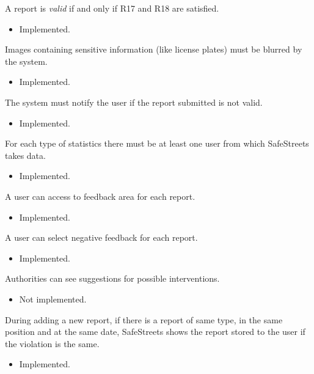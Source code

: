\documentclass[../ITD.tex]{subfiles}
\begin{document}
\begin{enumerate}
         A report is \textit{valid} if and only if R17 and R18 are satisfied.
        \begin{itemize}
            \item Implemented.
        \end{itemize}

         Images containing sensitive information (like license plates) must be blurred by the system.
        \begin{itemize}
            \item Implemented.
        \end{itemize}

         The system must notify the user if the report submitted is not valid.
        \begin{itemize}
            \item Implemented.
        \end{itemize}

         For each type of statistics there must be at least one user from which SafeStreets takes data.
        \begin{itemize}
            \item Implemented.
        \end{itemize}

         A user can access to feedback area for each report.
        \begin{itemize}
            \item Implemented.
        \end{itemize}

         A user can select negative feedback for each report.
        \begin{itemize}
            \item Implemented.
        \end{itemize}

         Authorities can see suggestions for possible interventions.
        \begin{itemize}
            \item Not implemented.
        \end{itemize}

         During adding a new report, if there is a report of same type, in the same position and at the same date,
        SafeStreets shows the report stored to the user if the violation is the same.
        \begin{itemize}
            \item Implemented.
        \end{itemize}


\end{enumerate}
\end{document}
